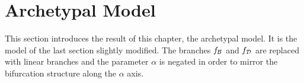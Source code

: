 \section{Archetypal Model}
\label{sec:setup.arch}

This section introduces the result of this chapter, the archetypal model.
It is the model of the last section slightly modified.
The branches $f_{\mathcal{B}}$ and $f_{\mathcal{D}}$ are replaced with linear branches and the parameter $\alpha$ is negated in order to mirror the bifurcation structure along the $\alpha$ axis.



